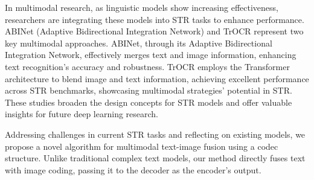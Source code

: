 \documentclass[runningheads]{llncs}
\begin{document}
In multimodal research, as linguistic models show increasing effectiveness, researchers are integrating these models into STR tasks to enhance performance\cite{li2023trocr,fang2021read_ABInet,fujitake2024dtrocr,zhao2023clip4str,ye2023ureader_llmocr,zeng2023large_llmocr,coquenet2023dan_llmocr}.	ABINet\cite{fang2021read_ABInet} (Adaptive Bidirectional Integration Network) and TrOCR\cite{li2023trocr} represent two key multimodal approaches.	ABINet, through its Adaptive Bidirectional Integration Network, effectively merges text and image information, enhancing text recognition's accuracy and robustness.	TrOCR employs the Transformer architecture to blend image and text information, achieving excellent performance across STR benchmarks, showcasing multimodal strategies' potential in STR.	These studies broaden the design concepts for STR models and offer valuable insights for future deep learning research.	

Addressing challenges in current STR tasks and reflecting on existing models, we propose a novel algorithm for multimodal text-image fusion using a codec structure.	Unlike traditional complex text models, our method directly fuses text with image coding, passing it to the decoder as the encoder's output.	
\end{document}
